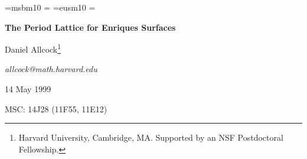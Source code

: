 

\def\I#1,#2{I_{#1,#2}}   %
\def\II#1,#2{II_{#1,#2}} %
\def\Z{{\bbb Z}}     %
\def\Q{{\bbb Q}}     %
\def\C{{\bbb C}}     %
\def\R{{\bbb R}}		%
\def\aut{\mathop{\rm Aut}\nolimits}
\def\mod{\mathop{\rm mod}\nolimits}
\def\H{{\cal H}}	%
\def\D{{\cal D}}	%
\def\G{\Gamma}		%
\def\sset{\subseteq}
\def\Stil{\tilde{S}}	%
\def\i{\imath}		%
\def\isomorphism{\cong}
\def\w{\omega}		%
\def\wbar{\bar{\w}}
\def\tensor{\otimes}
\def\ip#1#2{\langle #1 | #2\rangle}
\def\spanof#1{\langle #1\rangle}
\def\congruent{\equiv}
\def\Ahat{\hat{A}}
\def\Khat{\hat{K}}
\def\a{\alpha}
\def\b{\beta}
\def\rom#1{({\it\romannumeral#1\/})}

\def\qed{\leavevmode\vrule height0pt width0pt
	depth0pt\nobreak\hfill\proofbox\smallskip}
\def\proofbox{\box{1.3ex}{1.3ex}{.1ex}}
\def\box#1#2#3{\hbox{%
\vrule height#2 depth0pt width#3\kern-#3%
\raise#2\hbox{\vrule height0pt depth#3 width#1}\kern-#1%
\vrule height#3 depth0pt width#1\kern-#3%
\vrule height#2 depth0pt width#3%
}}

\newfam\bbbfont
\font\tenbbb=msbm10
\textfont\bbbfont=\tenbbb
\def\bbb{\fam=\bbbfont}
\newfam\calfont
\font\tencal=eusm10
\textfont\calfont=\tencal 
\def\cal{\fam=\calfont}	

\parskip=0pt


\begingroup
\parindent=0pt
{\bf The Period Lattice for Enriques Surfaces}

\medskip

Daniel Allcock\footnote*{Harvard University, Cambridge, MA. 
Supported by an NSF Postdoctoral Fellowship.}

{\it allcock@math.harvard.edu}

14 May 1999

MSC: 14J28 (11F55, 11E12)
\endgroup

